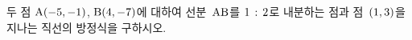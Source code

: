 두 점 $\mathrm{A}(-5{,}\mkern3mu\mathopen{}-1)$, $\mathrm{B}(4{,}\mkern3mu\mathopen{}-7)$에 대하여 선분~$\mathrm{AB}$를 $1\mkern3mu :\mkern3mu 2$로 내분하는 점과 점~$(1{,}\mkern3mu\mathopen{}3)$을 지나는 직선의 방정식을 구하시오.
